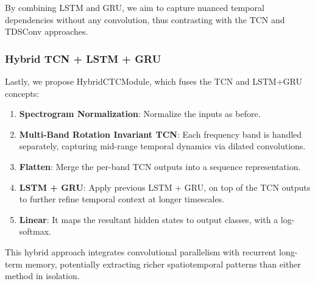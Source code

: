 By combining LSTM and GRU, we aim to capture nuanced temporal dependencies without any convolution, thus contrasting with the TCN and TDSConv approaches.

\subsubsection{Hybrid TCN + LSTM + GRU}

Lastly, we propose HybridCTCModule, which fuses the TCN and LSTM+GRU concepts:

\begin{enumerate}
    \item\textbf{Spectrogram Normalization}: Normalize the inputs as before.

    \item\textbf{Multi-Band Rotation Invariant TCN}: Each frequency band is handled separately, capturing mid-range temporal dynamics via dilated convolutions.

    \item\textbf{Flatten}: Merge the per-band TCN outputs into a sequence representation.

    \item\textbf{LSTM + GRU}: Apply previous LSTM + GRU, on top of the TCN outputs to further refine temporal context at longer timescales.

    \item\textbf{Linear}: It maps the resultant hidden states to output classes, with a log-softmax.
\end{enumerate}

This hybrid approach integrates convolutional parallelism with recurrent long-term memory, potentially extracting richer spatiotemporal patterns than either method in isolation.
